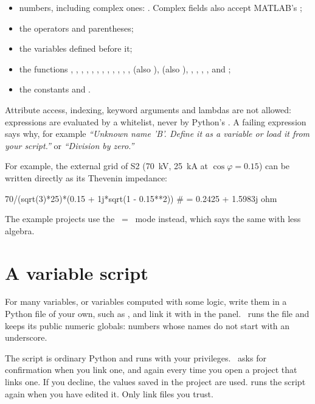 \begin{itemize}
  \item numbers, including complex ones: . Complex fields also accept
    MATLAB's ;
  \item the operators \code{+ - * / // \% **} and parentheses;
  \item the variables defined before it;
  \item the functions , , , , ,
    , , , , , ,
    ,  (also ),  (also ),
    , , , ,  and ;
  \item the constants  and .
\end{itemize}

Attribute access, indexing, keyword arguments and lambdas are not allowed: expressions
are evaluated by a whitelist, never by Python's . A failing expression says
why, for example \emph{``Unknown name 'B'. Define it as a variable or load it from your
script.''} or \emph{``Division by zero.''}

For example, the external grid of S2 (70~kV, 25~kA at $\cos\varphi = 0.15$) can be
written directly as its Thevenin impedance:

\begin{terminal}
70/(sqrt(3)*25)*(0.15 + 1j*sqrt(1 - 0.15**2))      # = 0.2425 + 1.5983j ohm
\end{terminal}

The example projects use the ~=~ mode instead, which says
the same with less algebra.

\section{A variable script}\label{sec:script}

For many variables, or variables computed with some logic, write them in a Python file
of your own, such as , and link it with  in the  panel. \app\ runs the file and keeps its public numeric
globals: numbers whose names do not start with an underscore.

\begin{caution}
The script is ordinary Python and runs with your privileges. \app\ asks for confirmation
when you link one, and again every time you open a project that links one. If you
decline, the values saved in the project are used.  runs the script again
when you have edited it. Only link files you trust.
\end{caution}

